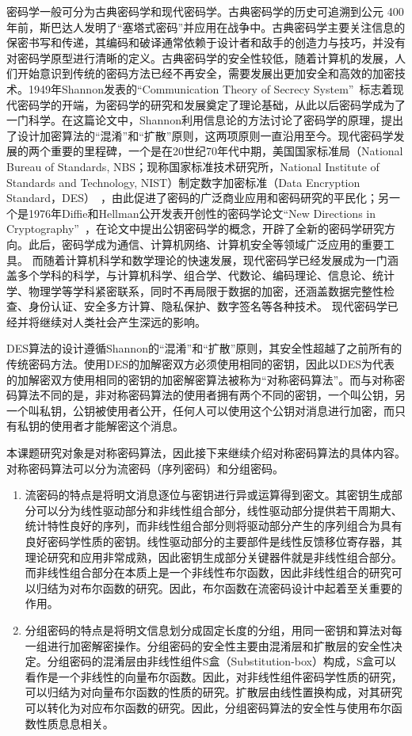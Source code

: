 \documentclass[a4paper,zihao=-4,AutoFakeBold]{ctexart}
\begin{document}
密码学一般可分为古典密码学和现代密码学。古典密码学的历史可追溯到公元 400 年前，斯巴达人发明了``塞塔式密码''并应用在战争中。古典密码学主要关注信息的保密书写和传递，其编码和破译通常依赖于设计者和敌手的创造力与技巧，并没有对密码学原型进行清晰的定义。古典密码学的安全性较低，随着计算机的发展，人们开始意识到传统的密码方法已经不再安全，需要发展出更加安全和高效的加密技术。1949年Shannon发表的``Communication Theory of Secrecy System''~\cite{Shannon49}标志着现代密码学的开端，为密码学的研究和发展奠定了理论基础，从此以后密码学成为了一门科学。在这篇论文中，Shannon利用信息论的方法讨论了密码学的原理，提出了设计加密算法的``混淆''和``扩散''原则，这两项原则一直沿用至今。现代密码学发展的两个重要的里程碑，一个是在20世纪70年代中期，美国国家标准局（National Bureau of Standards, NBS；现称国家标准技术研究所，National Institute of Standards and Technology, NIST）制定数字加密标准（Data Encryption Standard，DES）~\cite{DES}，由此促进了密码的广泛商业应用和密码研究的平民化；另一个是1976年Diffie和Hellman公开发表开创性的密码学论文``New Directions in Cryptography''~\cite{DiffieHellman}，在论文中提出公钥密码学的概念，开辟了全新的密码学研究方向。此后，密码学成为通信、计算机网络、计算机安全等领域广泛应用的重要工具。
而随着计算机科学和数学理论的快速发展，现代密码学已经发展成为一门涵盖多个学科的科学，与计算机科学、组合学、代数论、编码理论、信息论、统计学、物理学等学科紧密联系，同时不再局限于数据的加密，还涵盖数据完整性检查、身份认证、安全多方计算、隐私保护、数字签名等各种技术。
现代密码学已经并将继续对人类社会产生深远的影响。

DES算法的设计遵循Shannon的``混淆''和``扩散''原则，其安全性超越了之前所有的传统密码方法。使用DES的加解密双方必须使用相同的密钥，因此以DES为代表的加解密双方使用相同的密钥的加密解密算法被称为``对称密码算法''。而与对称密码算法不同的是，非对称密码算法的使用者拥有两个不同的密钥，一个叫公钥，另一个叫私钥，公钥被使用者公开，任何人可以使用这个公钥对消息进行加密，而只有私钥的使用者才能解密这个消息。

本课题研究对象是对称密码算法，因此接下来继续介绍对称密码算法的具体内容。对称密码算法可以分为流密码（序列密码）和分组密码。
\begin{enumerate}[label=(\arabic{*})]
    \item 流密码的特点是将明文消息逐位与密钥进行异或运算得到密文。其密钥生成部分可以分为线性驱动部分和非线性组合部分，线性驱动部分提供若干周期大、统计特性良好的序列，而非线性组合部分则将驱动部分产生的序列组合为具有良好密码学性质的密钥。线性驱动部分的主要部件是线性反馈移位寄存器，其理论研究和应用非常成熟，因此密钥生成部分关键器件就是非线性组合部分。而非线性组合部分在本质上是一个非线性布尔函数，因此非线性组合的研究可以归结为对布尔函数的研究。因此，布尔函数在流密码设计中起着至关重要的作用。
    \item 分组密码的特点是将明文信息划分成固定长度的分组，用同一密钥和算法对每一组进行加密解密操作。分组密码的安全性主要由混淆层和扩散层的安全性决定。分组密码的混淆层由非线性组件S盒（Substitution-box）构成，S盒可以看作是一个非线性的向量布尔函数。因此，对非线性组件密码学性质的研究，可以归结为对向量布尔函数的性质的研究。扩散层由线性置换构成，对其研究可以转化为对应布尔函数的研究。因此，分组密码算法的安全性与使用布尔函数性质息息相关。
\end{enumerate}
\end{document}
